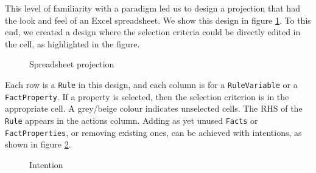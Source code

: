 This level of familiarity with a paradigm led us to design a projection that had the look and feel of an Excel spreadsheet.
We show this design in figure \ref{fig:SpreadsheetProjection}.
To this end, we created a design where the selection criteria could be directly edited in the cell, as highlighted in the figure.

\begin{figure}
    \centering
    \caption{Spreadsheet projection}
    \label{fig:SpreadsheetProjection}
\end{figure}


Each row is a \texttt{Rule} in this design, and each column is for a \texttt{RuleVariable} or a \texttt{FactProperty}.
If a property is selected, then the selection criterion is in the appropriate cell.
A grey/beige colour indicates unselected cells.
The RHS of the \texttt{Rule} appears in the actions column.
Adding as yet unused \texttt{Facts} or \texttt{FactProperties}, or removing existing ones, can be achieved with intentions, as shown in figure \ref{fig:SpreadsheetIntentions}.


\begin{figure}
    \centering
    \caption{Intention}
    \label{fig:SpreadsheetIntentions}
\end{figure}


